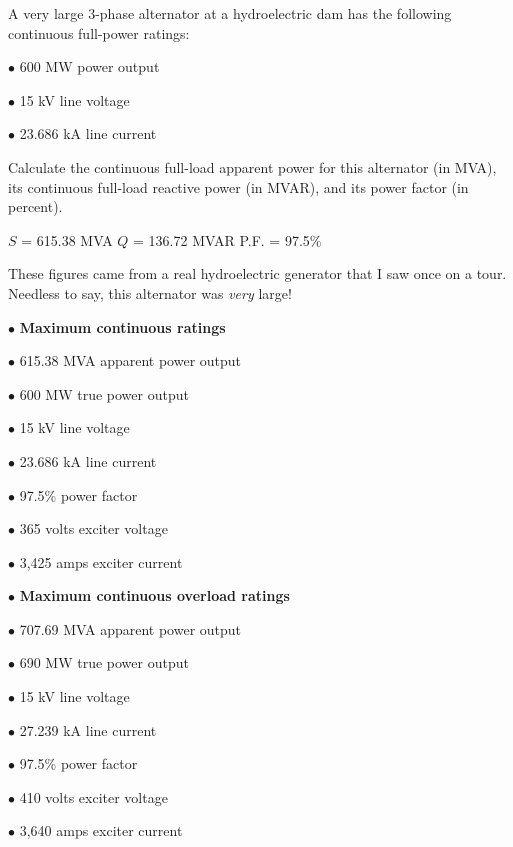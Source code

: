

A very large 3-phase alternator at a hydroelectric dam has the following continuous full-power ratings:

\medskip
\item{$\bullet$} 600 MW power output
\item{$\bullet$} 15 kV line voltage
\item{$\bullet$} 23.686 kA line current
\medskip

Calculate the continuous full-load apparent power for this alternator (in MVA), its continuous full-load reactive power (in MVAR), and its power factor (in percent).







$S$ = 615.38 MVA \hskip 30pt $Q$ = 136.72 MVAR \hskip 30pt P.F. = 97.5\%







These figures came from a real hydroelectric generator that I saw once on a tour.  Needless to say, this alternator was {\it very} large!

\medskip
\item{$\bullet$} {\bf Maximum continuous ratings}
\item{$\bullet$} 615.38 MVA apparent power output
\item{$\bullet$} 600 MW true power output
\item{$\bullet$} 15 kV line voltage
\item{$\bullet$} 23.686 kA line current
\item{$\bullet$} 97.5\% power factor
\item{$\bullet$} 365 volts exciter voltage
\item{$\bullet$} 3,425 amps exciter current
\medskip

\medskip
\item{$\bullet$} {\bf Maximum continuous overload ratings}
\item{$\bullet$} 707.69 MVA apparent power output
\item{$\bullet$} 690 MW true power output
\item{$\bullet$} 15 kV line voltage
\item{$\bullet$} 27.239 kA line current
\item{$\bullet$} 97.5\% power factor
\item{$\bullet$} 410 volts exciter voltage
\item{$\bullet$} 3,640 amps exciter current
\medskip




